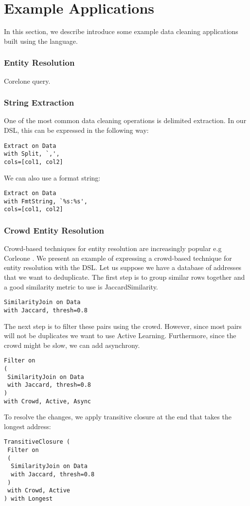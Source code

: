\section{Example Applications} 

In this section, we describe introduce some example data cleaning applications built using the \sys language.


\subsubsection{Entity Resolution}

Corelone query.


\subsubsection{String Extraction}
One of the most common data cleaning operations is delimited extraction.
In our DSL, this can be expressed in the following way:
\begin{lstlisting}
Extract on Data
with Split, `,',
cols=[col1, col2]
\end{lstlisting}

We can also use a format string:
\begin{lstlisting}
Extract on Data
with FmtString, `%s:%s',
cols=[col1, col2]
\end{lstlisting}

\subsubsection{Crowd Entity Resolution}
Crowd-based techniques for entity resolution are increasingly popular e.g Corleone \cite{DBLP:conf/sigmod/GokhaleDDNRSZ14}.
We present an example of expressing a crowd-based technique for entity resolution with the DSL.
Let us suppose we have a database of addresses that we want to deduplicate.
The first step is to group similar rows together and a good similarity metric to use is JaccardSimilarity.
\begin{lstlisting}
SimilarityJoin on Data
with Jaccard, thresh=0.8
\end{lstlisting}
The next step is to filter these pairs using the crowd. 
However, since most pairs will not be duplicates we want to use Active Learning.
Furthermore, since the crowd might be slow, we can add asynchrony.
\begin{lstlisting}
Filter on
( 
 SimilarityJoin on Data
 with Jaccard, thresh=0.8
)
with Crowd, Active, Async
\end{lstlisting}
To resolve the changes, we apply transitive closure at the end that takes the 
longest address:
\begin{lstlisting}
TransitiveClosure (
 Filter on
 ( 
  SimilarityJoin on Data
  with Jaccard, thresh=0.8
 )
 with Crowd, Active
) with Longest
\end{lstlisting}


